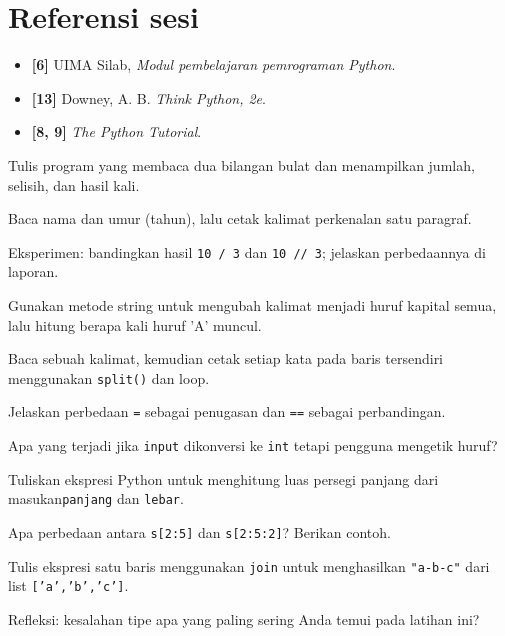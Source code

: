 \documentclass[../main.tex]{subfiles}
\begin{document}
\section{Referensi sesi}

\begin{itemize}[leftmargin=*]
  \item \textbf{[6]} UIMA Silab, \textit{Modul pembelajaran pemrograman Python}.
  \item \textbf{[13]} Downey, A. B. \textit{Think Python, 2e}.
  \item \textbf{[8, 9]} \textit{The Python Tutorial}.
\end{itemize}

\begin{aktivitas}
  \item Tulis program yang membaca dua bilangan bulat dan menampilkan jumlah, selisih, dan hasil kali.
  \item Baca nama dan umur (tahun), lalu cetak kalimat perkenalan satu paragraf.
  \item Eksperimen: bandingkan hasil \texttt{10 / 3} dan \texttt{10 // 3}; jelaskan perbedaannya di laporan.
  \item Gunakan metode string untuk mengubah kalimat menjadi huruf kapital semua, lalu hitung berapa kali huruf 'A' muncul.
  \item Baca sebuah kalimat, kemudian cetak setiap kata pada baris tersendiri menggunakan \texttt{split()} dan loop.
\end{aktivitas}

\begin{latihan}
  \item Jelaskan perbedaan \texttt{=} sebagai penugasan dan \texttt{==} sebagai perbandingan.
  \item Apa yang terjadi jika \texttt{input} dikonversi ke \texttt{int} tetapi pengguna mengetik huruf?
  \item Tuliskan ekspresi Python untuk menghitung luas persegi panjang dari masukan\newline \texttt{panjang} dan \texttt{lebar}.
  \item Apa perbedaan antara \texttt{s[2:5]} dan \texttt{s[2:5:2]}? Berikan contoh.
  \item Tulis ekspresi satu baris menggunakan \texttt{join} untuk menghasilkan \texttt{"a-b-c"} dari list \texttt{['a','b','c']}.
  \item Refleksi: kesalahan tipe apa yang paling sering Anda temui pada latihan ini?
\end{latihan}
\end{document}
